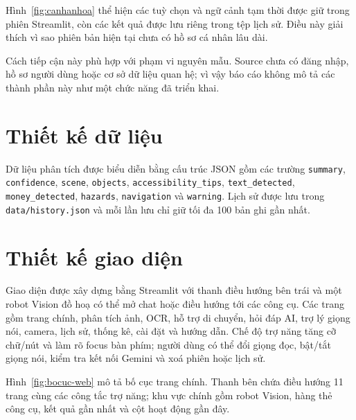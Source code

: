 Hình~\ref{fig:canhanhoa} thể hiện các tuỳ chọn và ngữ cảnh tạm thời được giữ
trong phiên Streamlit, còn các kết quả được lưu riêng trong tệp lịch sử.
Điều này giải thích vì sao phiên bản hiện tại chưa có hồ sơ cá nhân lâu dài.

Cách tiếp cận này phù hợp với phạm vi nguyên mẫu. Source chưa có đăng nhập,
hồ sơ người dùng hoặc cơ sở dữ liệu quan hệ; vì vậy báo cáo không mô tả các
thành phần này như một chức năng đã triển khai.

\section{Thiết kế dữ liệu}

Dữ liệu phân tích được biểu diễn bằng cấu trúc JSON gồm các trường \texttt{summary},
\texttt{confidence}, \texttt{scene}, \texttt{objects}, \texttt{accessibility\_tips}, \texttt{text\_detected},
\texttt{money\_detected}, \texttt{hazards}, \texttt{navigation} và \texttt{warning}. Lịch sử được lưu trong
\texttt{data/history.json} và mỗi lần lưu chỉ giữ tối đa 100 bản ghi gần nhất.

\section{Thiết kế giao diện}

Giao diện được xây dựng bằng Streamlit với thanh điều hướng bên trái và một
robot Vision đồ hoạ có thể mở chat hoặc điều hướng tới các công cụ. Các trang
gồm trang chính, phân tích ảnh, OCR, hỗ trợ di chuyển, hỏi đáp AI, trợ lý giọng
nói, camera, lịch sử, thống kê, cài đặt và hướng dẫn. Chế độ trợ năng tăng cỡ
chữ/nút và làm rõ focus bàn phím; người dùng có thể đổi giọng đọc, bật/tắt
giọng nói, kiểm tra kết nối Gemini và xoá phiên hoặc lịch sử.

Hình~\ref{fig:bocuc-web} mô tả bố cục trang chính. Thanh bên chứa điều hướng
11 trang cùng các công tắc trợ năng; khu vực chính gồm robot Vision, hàng
thẻ công cụ, kết quả gần nhất và cột hoạt động gần đây.

